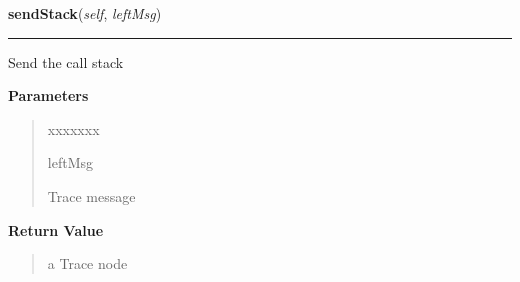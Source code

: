 \hspace{.8\funcindent}\begin{boxedminipage}{\funcwidth}

    \raggedright \textbf{sendStack}(\textit{self}, \textit{leftMsg})

    \vspace{-1.5ex}

    \rule{\textwidth}{0.5\fboxrule}
\setlength{\parskip}{2ex}
    Send the call stack

\setlength{\parskip}{1ex}
      \textbf{Parameters}
      \vspace{-1ex}

      \begin{quote}
        \begin{Ventry}{xxxxxxx}

          \item[leftMsg]

          Trace message

        \end{Ventry}

      \end{quote}

      \textbf{Return Value}
    \vspace{-1ex}

      \begin{quote}
      a Trace node

      \end{quote}

    \end{boxedminipage}

    \label{tracetool:TraceToSend:sendCaller}

    \vspace{0.5ex}

